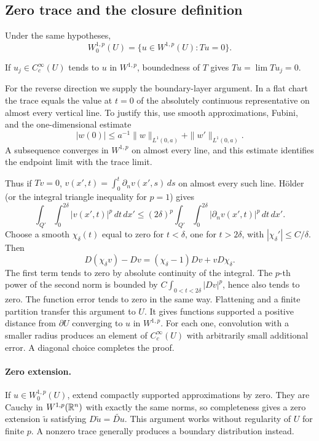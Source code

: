\subsection{Zero trace and the closure definition}
\begin{theorem}\label{thm:5-zero-trace}
Under the same hypotheses,
\[
 W^{1,p}_0(U)=\{u\in W^{1,p}(U):Tu=0\}.
\]
\end{theorem}
\begin{expandedproof}
If $u_j\in C_c^\infty(U)$ tends to $u$ in $W^{1,p}$, boundedness of $T$
gives $Tu=\lim Tu_j=0$.

For the reverse direction we supply the boundary-layer argument.
In a flat chart the trace equals the value at $t=0$ of the absolutely
continuous representative on almost every vertical line. To justify
this, use smooth approximations, Fubini, and the one-dimensional estimate
\[
 |w(0)|\leq a^{-1}\|w\|_{L^1(0,a)}+\|w'\|_{L^1(0,a)}.
\]
A subsequence converges in $W^{1,p}$ on almost every line, and this
estimate identifies the endpoint limit with the trace limit.

Thus if $Tv=0$,
$v(x',t)=\int_0^t\partial_n v(x',s)\,ds$ on almost every such line.
H\"older (or the integral triangle inequality for $p=1$) gives
\[
 \int_{Q'}\int_0^{2\delta}|v(x',t)|^p\,dt\,dx'
 \leq (2\delta)^p
       \int_{Q'}\int_0^{2\delta}|\partial_n v(x',t)|^p\,dt\,dx'.
\]
Choose a smooth $\chi_\delta(t)$ equal to zero for $t<\delta$, one
for $t>2\delta$, with $|\chi_\delta'|\leq C/\delta$. Then
\[
 D(\chi_\delta v)-Dv
 =(\chi_\delta-1)Dv+vD\chi_\delta.
\]
The first term tends to zero by absolute continuity of the integral.
The $p$-th power of the second norm is bounded by
$C\int_{0<t<2\delta}|Dv|^p$, hence also tends to zero.
The function error tends to zero in the same way.
Flattening and a finite partition transfer this argument to $U$.
It gives functions supported a positive distance from $\partial U$
converging to $u$ in $W^{1,p}$. For each one, convolution with a smaller
radius produces an element of $C_c^\infty(U)$ with arbitrarily small
additional error. A diagonal choice completes the proof.
\end{expandedproof}
\Needspace{45mm}

\paragraph{Zero extension.}
If $u\in W^{1,p}_0(U)$, extend compactly supported approximations by
zero. They are Cauchy in $W^{1,p}(\mathbb{R}^n)$ with exactly the same norms,
so completeness gives a zero extension $\widetilde u$ satisfying
$D\widetilde u=\widetilde{Du}$. This argument works without regularity
of $U$ for finite $p$. A nonzero trace generally produces a boundary
distribution instead.
